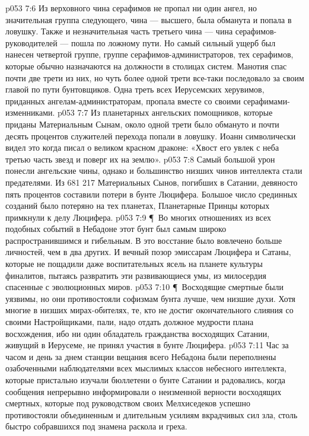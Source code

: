 \vs p053 7:6 Из верховного чина серафимов не пропал ни один ангел, но значительная группа следующего, чина --- высшего, была обманута и попала в ловушку. Также и незначительная часть третьего чина --- чина серафимов\hyp{}руководителей --- пошла по ложному пути. Но самый сильный ущерб был нанесен четвертой группе, группе серафимов\hyp{}администраторов, тех серафимов, которые обычно назначаются на должности в столицах систем. Манотия спас почти две трети из них, но чуть более одной трети все\hyp{}таки последовало за своим главой по пути бунтовщиков. Одна треть всех Иерусемских херувимов, приданных ангелам\hyp{}администраторам, пропала вместе со своими серафимами\hyp{}изменниками.
\vs p053 7:7 Из планетарных ангельских помощников, которые приданы Материальным Сынам, около одной трети было обмануто и почти десять процентов служителей перехода попали в ловушку. Иоанн символически видел это когда писал о великом красном драконе: «Хвост его увлек с неба третью часть звезд и поверг их на землю».
\vs p053 7:8 Самый большой урон понесли ангельские чины, однако и большинство низших чинов интеллекта стали предателями. Из 681 217 Материальных Сынов, погибших в Сатании, девяносто пять процентов составили потери в бунте Люцифера. Большое число срединных созданий было потеряно на тех планетах, Планетарные Принцы которых примкнули к делу Люцифера.
\vs p053 7:9 \P\ Во многих отношениях из всех подобных событий в Небадоне этот бунт был самым широко распространившимся и гибельным. В это восстание было вовлечено больше личностей, чем в два других. И вечный позор эмиссарам Люцифера и Сатаны, которые не пощадили даже воспитательных ясель на планете культуры финалитов, пытаясь развратить эти развивающиеся умы, из милосердия спасенные с эволюционных миров.
\vs p053 7:10 \P\ Восходящие смертные были уязвимы, но они противостояли софизмам бунта лучше, чем низшие духи. Хотя многие в низших мирах\hyp{}обителях, те, кто не достиг окончательного слияния со своими Настройщиками, пали, надо отдать должное мудрости плана восхождения, ибо ни один обладатель гражданства восходящих Сатании, живущий в Иерусеме, не принял участия в бунте Люцифера.
\vs p053 7:11 Час за часом и день за днем станции вещания всего Небадона были переполнены озабоченными наблюдателями всех мыслимых классов небесного интеллекта, которые пристально изучали бюллетени о бунте Сатании и радовались, когда сообщения непрерывно информировали о неизменной верности восходящих смертных, которые под руководством своих Мелхиседеков успешно противостояли объединенным и длительным усилиям вкрадчивых сил зла, столь быстро собравшихся под знамена раскола и греха.
